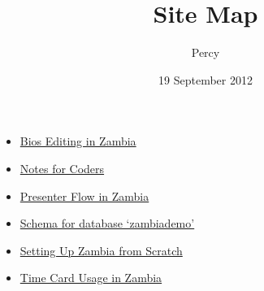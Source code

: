 \documentclass{article}
\title{Site Map}
\author{Percy}
\date{19 September 2012}
\begin{document}
\maketitle


\begin{itemize}
\item \href{file:///home/dkap/nelaroot/www/FFF-NE-38/Documentation/Source/Bio_Editing.org}{Bios Editing in Zambia}
\item \href{file:///home/dkap/nelaroot/www/FFF-NE-38/Documentation/Source/NotesForCoders.org}{Notes for Coders}
\item \href{file:///home/dkap/nelaroot/www/FFF-NE-38/Documentation/Source/Presenter_Flow.org}{Presenter Flow in Zambia}
\item \href{file:///home/dkap/nelaroot/www/FFF-NE-38/Documentation/Source/schema.org}{Schema for database `zambiademo'}
\item \href{file:///home/dkap/nelaroot/www/FFF-NE-38/Documentation/Source/Setting_Up.org}{Setting Up Zambia from Scratch}
\item \href{file:///home/dkap/nelaroot/www/FFF-NE-38/Documentation/Source/Time_Card.org}{Time Card Usage in Zambia}
\end{itemize}
\end{document}

